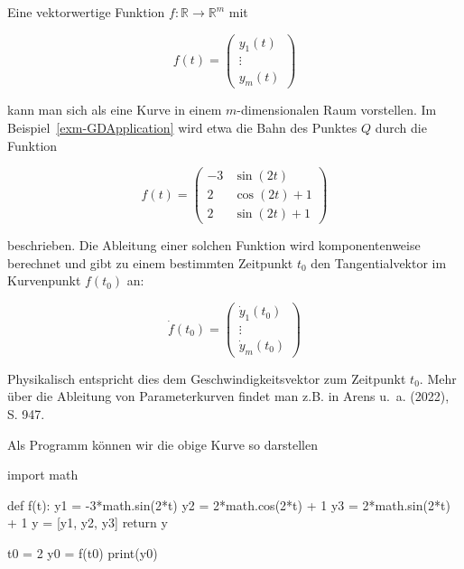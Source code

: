 \documentclass[
  a4paper,
  DIV=11]{scrreprt}
\newenvironment{Shaded}{\begin{snugshade}}{\end{snugshade}}
\newcommand{\BuiltInTok}[1]{\textcolor[rgb]{0.00,0.23,0.31}{#1}}
\newcommand{\ControlFlowTok}[1]{\textcolor[rgb]{0.00,0.23,0.31}{#1}}
\newcommand{\DecValTok}[1]{\textcolor[rgb]{0.68,0.00,0.00}{#1}}
\newcommand{\ImportTok}[1]{\textcolor[rgb]{0.00,0.46,0.62}{#1}}
\newcommand{\KeywordTok}[1]{\textcolor[rgb]{0.00,0.23,0.31}{#1}}
\newcommand{\NormalTok}[1]{\textcolor[rgb]{0.00,0.23,0.31}{#1}}
\newcommand{\OperatorTok}[1]{\textcolor[rgb]{0.37,0.37,0.37}{#1}}
\theoremstyle{definition}
\theoremstyle{definition}
\theoremstyle{remark}
\begin{document}
Eine vektorwertige Funktion \(f : \mathbb{R}\rightarrow\mathbb{R}^m\)
mit

\[
f(t) = \begin{pmatrix} y_1(t) \\ \vdots \\ y_m(t) \end{pmatrix}
\]

kann man sich als eine Kurve in einem \(m\)-dimensionalen Raum
vorstellen. Im Beispiel~\ref{exm-GDApplication} wird etwa die Bahn des
Punktes \(Q\) durch die Funktion

\[
f(t) = \left( \begin{align*} -3 &\sin(2t) \\ 2 &\cos(2t) + 1 \\ 2 &\sin(2t) + 1 \end{align*}  \right)
\]

beschrieben. Die Ableitung einer solchen Funktion wird komponentenweise
berechnet und gibt zu einem bestimmten Zeitpunkt \(t_0\) den
Tangentialvektor im Kurvenpunkt \(f(t_0)\) an:

\[
\dot{f}(t_0) = \begin{pmatrix} \dot y_1(t_0) \\ \vdots \\ \dot y_m(t_0) \end{pmatrix}
\]

Physikalisch entspricht dies dem Geschwindigkeitsvektor zum Zeitpunkt
\(t_0\). Mehr über die Ableitung von Parameterkurven findet man z.B. in
Arens u.~a. (2022), S. 947.

Als Programm können wir die obige Kurve so darstellen

\begin{Shaded}
\begin{Highlighting}[]
\ImportTok{import}\NormalTok{ math}

\KeywordTok{def}\NormalTok{ f(t):}
\NormalTok{    y1 }\OperatorTok{=} \OperatorTok{{-}}\DecValTok{3}\OperatorTok{*}\NormalTok{math.sin(}\DecValTok{2}\OperatorTok{*}\NormalTok{t)}
\NormalTok{    y2 }\OperatorTok{=}  \DecValTok{2}\OperatorTok{*}\NormalTok{math.cos(}\DecValTok{2}\OperatorTok{*}\NormalTok{t) }\OperatorTok{+} \DecValTok{1}
\NormalTok{    y3 }\OperatorTok{=}  \DecValTok{2}\OperatorTok{*}\NormalTok{math.sin(}\DecValTok{2}\OperatorTok{*}\NormalTok{t) }\OperatorTok{+} \DecValTok{1}
\NormalTok{    y }\OperatorTok{=}\NormalTok{ [y1, y2, y3]}
    \ControlFlowTok{return}\NormalTok{ y}

\NormalTok{t0 }\OperatorTok{=} \DecValTok{2}
\NormalTok{y0 }\OperatorTok{=}\NormalTok{ f(t0)}
\BuiltInTok{print}\NormalTok{(y0)}
\end{Highlighting}
\end{Shaded}
\end{document}
